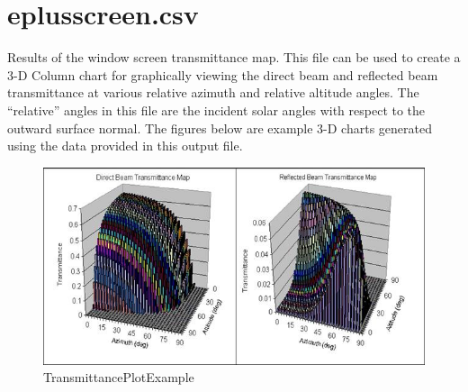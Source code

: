 \section{eplusscreen.csv}\label{eplusscreen.csv}

Results of the window screen transmittance map. This file can be used to create a 3-D Column chart for graphically viewing the direct beam and reflected beam transmittance at various relative azimuth and relative altitude angles. The ``relative'' angles in this file are the incident solar angles with respect to the outward surface normal. The figures below are example 3-D charts generated using the data provided in this output file.

\begin{figure}[htbp]
\centering
\includegraphics{media/image022.jpg}
\caption{TransmittancePlotExample}
\end{figure}
